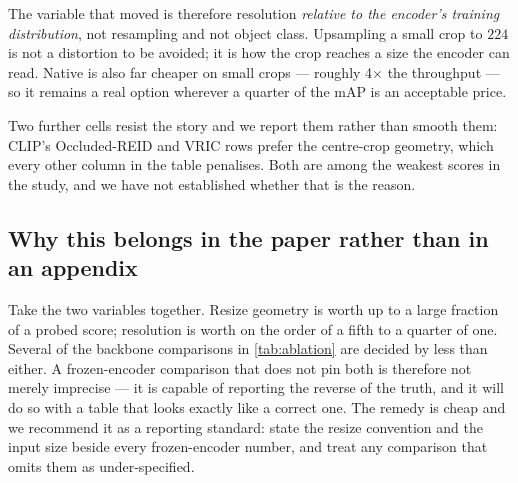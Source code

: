 The variable that moved is therefore resolution \emph{relative to the encoder's training
distribution}, not resampling and not object class. Upsampling a small crop to $224$ is not a
distortion to be avoided; it is how the crop reaches a size the encoder can read. Native is
also far cheaper on small crops --- roughly 4$\times$ the throughput --- so it remains a real
option wherever a quarter of the mAP is an acceptable price.

Two further cells resist the story and we report them rather than smooth them: CLIP's
Occluded-REID and VRIC rows prefer the centre-crop geometry, which every other column in the
table penalises. Both are among the weakest scores in the study, and we have not established
whether that is the reason.

\subsection{Why this belongs in the paper rather than in an appendix}
Take the two variables together. Resize geometry is worth up to a large fraction of a probed
score; resolution is worth on the order of a fifth to a quarter of one. Several of the backbone
comparisons in \cref{tab:ablation} are decided by less than either. A frozen-encoder comparison
that does not pin both is therefore not merely imprecise --- it is capable of reporting the
reverse of the truth, and it will do so with a table that looks exactly like a correct one.
The remedy is cheap and we recommend it as a reporting standard: state the resize convention
and the input size beside every frozen-encoder number, and treat any comparison that omits
them as under-specified.

\begin{table}[t]
\centering
\caption{Extraction throughput on this study's single RTX 2070 Max-Q, Market-1501, frozen
features. A throughput figure measures a machine and a moment, not a model --- one cell here
first recorded 2.2 img/s against 12.8 for the same encoder elsewhere because
another process held part of the card; re-extracting on a quiet card gave 12.3, and the
metrics never moved.}
\label{tab:cost}
\scriptsize

\end{table}
